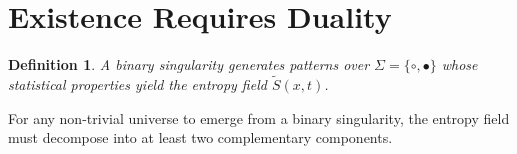 \documentclass[12pt, a4paper]{article}
\newtheorem{definition}{Definition}[section]
\begin{document}
\section{Existence Requires Duality}

\begin{definition}
A \emph{binary singularity} generates patterns over 
$\Sigma = \{\circ, \bullet\}$ whose statistical properties yield the entropy field $\tilde{S}(x,t)$.
\end{definition}

\begin{theorem}
For any non-trivial universe to emerge from a binary singularity, the entropy field must decompose into at least two complementary components.
\end{theorem}
\end{document}
